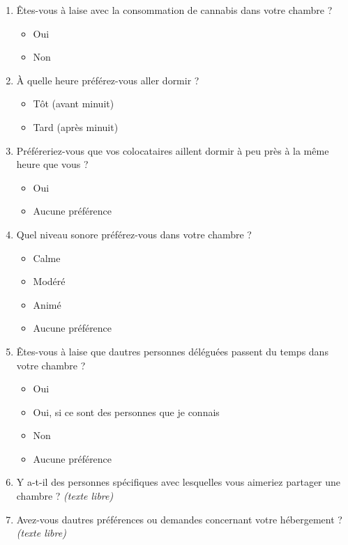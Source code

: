 \begin{enumerate}
\begin{enumerate}
   \item
    Êtes-vous à l\textquotesingle aise avec la consommation de cannabis dans votre chambre ?
    \begin{itemize}
     \item Oui
     \item Non
    \end{itemize}

   \item
    À quelle heure préférez-vous aller dormir ?
    \begin{itemize}
     \item Tôt (avant minuit)
     \item Tard (après minuit)
    \end{itemize}

   \item
    Préféreriez-vous que vos colocataires aillent dormir à peu près à la même heure que vous ?
    \begin{itemize}
     \item Oui
     \item Aucune préférence
    \end{itemize}

   \item
    Quel niveau sonore préférez-vous dans votre chambre ?
    \begin{itemize}
     \item Calme
     \item Modéré
     \item Animé
     \item Aucune préférence
    \end{itemize}

   \item
    Êtes-vous à l\textquotesingle aise que d\textquotesingle autres personnes déléguées passent du temps dans votre chambre ?
    \begin{itemize}
     \item Oui
     \item Oui, si ce sont des personnes que je connais
     \item Non
     \item Aucune préférence
    \end{itemize}

   \item
    Y a-t-il des personnes spécifiques avec lesquelles vous aimeriez partager une chambre ? \emph{(texte libre)}

   \item
    Avez-vous d\textquotesingle autres préférences ou demandes concernant votre hébergement ? \emph{(texte libre)}

  \end{enumerate}
\end{enumerate}

